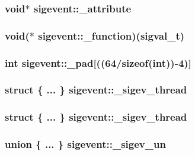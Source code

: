 \subsubsection[{\_\-attribute}]{\setlength{\rightskip}{0pt plus 5cm}void$\ast$ {\bf sigevent::\_\-attribute}}\label{structsigevent_a059b220fad09b524b48c34ff65761a32}
\subsubsection[{\_\-function}]{\setlength{\rightskip}{0pt plus 5cm}void($\ast$ {\bf sigevent::\_\-function})({\bf sigval\_\-t})}\label{structsigevent_a8404b069b1af9c92971a24d59537646d}
\subsubsection[{\_\-pad}]{\setlength{\rightskip}{0pt plus 5cm}int {\bf sigevent::\_\-pad}[((64/sizeof(int))-\/4)]}\label{structsigevent_a63f9e4e3988ce50ed94fa5e601f8d6d5}
\subsubsection[{\_\-sigev\_\-thread}]{\setlength{\rightskip}{0pt plus 5cm}struct \{ ... \}   {\bf sigevent::\_\-sigev\_\-thread}}\label{structsigevent_adf0d5f931b24a122ed93a46ff97452f7}
\subsubsection[{\_\-sigev\_\-thread}]{\setlength{\rightskip}{0pt plus 5cm}struct \{ ... \}   {\bf sigevent::\_\-sigev\_\-thread}}\label{structsigevent_ab5ea879e537a904b979e61a82197eef8}
\subsubsection[{\_\-sigev\_\-un}]{\setlength{\rightskip}{0pt plus 5cm}union \{ ... \}   {\bf sigevent::\_\-sigev\_\-un}}\label{structsigevent_a491a279f390a056750a3106e0adae6c5}
